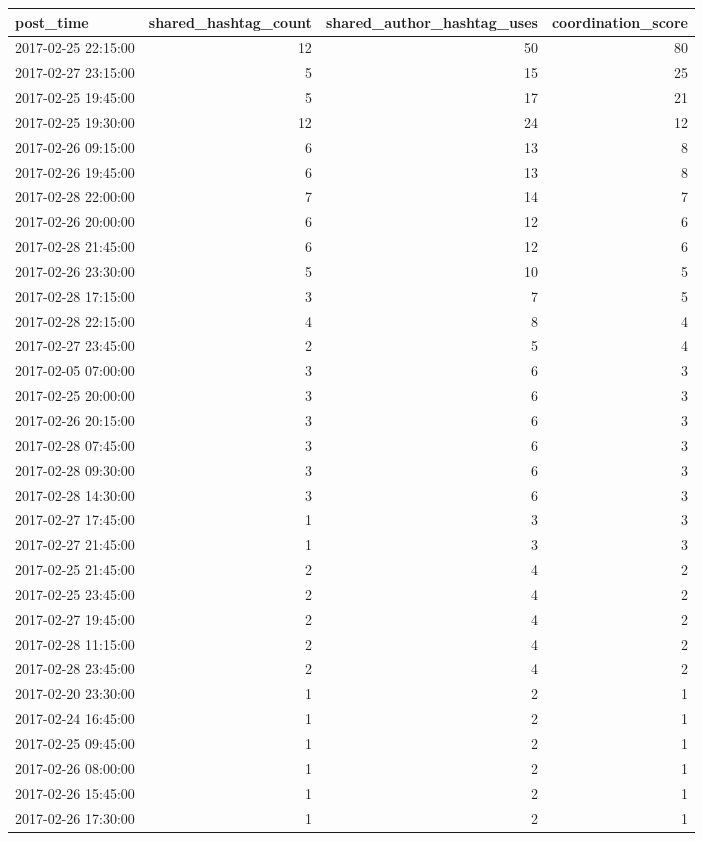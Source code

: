\begin{tabular}{lrrr}
\toprule
post\_time & shared\_hashtag\_count & shared\_author\_hashtag\_uses & coordination\_score \\
\midrule
2017-02-25 22:15:00 & 12 & 50 & 80 \\
2017-02-27 23:15:00 & 5 & 15 & 25 \\
2017-02-25 19:45:00 & 5 & 17 & 21 \\
2017-02-25 19:30:00 & 12 & 24 & 12 \\
2017-02-26 09:15:00 & 6 & 13 & 8 \\
2017-02-26 19:45:00 & 6 & 13 & 8 \\
2017-02-28 22:00:00 & 7 & 14 & 7 \\
2017-02-26 20:00:00 & 6 & 12 & 6 \\
2017-02-28 21:45:00 & 6 & 12 & 6 \\
2017-02-26 23:30:00 & 5 & 10 & 5 \\
2017-02-28 17:15:00 & 3 & 7 & 5 \\
2017-02-28 22:15:00 & 4 & 8 & 4 \\
2017-02-27 23:45:00 & 2 & 5 & 4 \\
2017-02-05 07:00:00 & 3 & 6 & 3 \\
2017-02-25 20:00:00 & 3 & 6 & 3 \\
2017-02-26 20:15:00 & 3 & 6 & 3 \\
2017-02-28 07:45:00 & 3 & 6 & 3 \\
2017-02-28 09:30:00 & 3 & 6 & 3 \\
2017-02-28 14:30:00 & 3 & 6 & 3 \\
2017-02-27 17:45:00 & 1 & 3 & 3 \\
2017-02-27 21:45:00 & 1 & 3 & 3 \\
2017-02-25 21:45:00 & 2 & 4 & 2 \\
2017-02-25 23:45:00 & 2 & 4 & 2 \\
2017-02-27 19:45:00 & 2 & 4 & 2 \\
2017-02-28 11:15:00 & 2 & 4 & 2 \\
2017-02-28 23:45:00 & 2 & 4 & 2 \\
2017-02-20 23:30:00 & 1 & 2 & 1 \\
2017-02-24 16:45:00 & 1 & 2 & 1 \\
2017-02-25 09:45:00 & 1 & 2 & 1 \\
2017-02-26 08:00:00 & 1 & 2 & 1 \\
2017-02-26 15:45:00 & 1 & 2 & 1 \\
2017-02-26 17:30:00 & 1 & 2 & 1 \\

\end{tabular}
